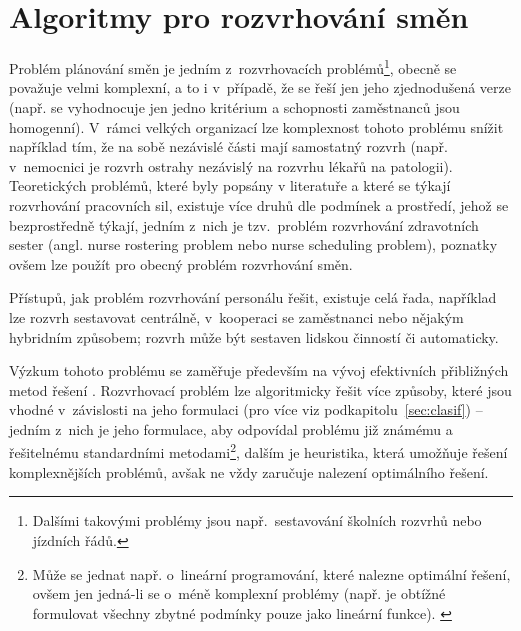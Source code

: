 \documentclass[twoside]{ctuthesis}
\begin{document}


%
%



\chapter{Algoritmy pro rozvrhování směn}
Problém plánování směn je jedním z~rozvrhovacích problémů\footnote{Dalšími takovými problémy jsou např.~sestavování školních rozvrhů nebo jízdních řádů.}, obecně se považuje velmi komplexní, a to i v~případě, že se řeší jen jeho zjednodušená verze (např. se vyhodnocuje jen jedno kritérium a schopnosti zaměstnanců jsou homogenní). V~rámci velkých organizací lze komplexnost tohoto problému snížit například tím, že na sobě nezávislé části mají samostatný rozvrh (např. v~nemocnici je rozvrh ostrahy nezávislý na rozvrhu lékařů na patologii). Teoretických problémů, které byly popsány v literatuře a které se týkají rozvrhování pracovních sil, existuje více druhů dle podmínek a prostředí, jehož se bezprostředně týkají, jedním z~nich je tzv.~problém rozvrhování zdravotních sester (angl. nurse rostering problem nebo nurse scheduling problem), poznatky ovšem lze použít pro obecný problém rozvrhování směn.

Přístupů, jak problém rozvrhování personálu řešit, existuje celá řada, například lze rozvrh sestavovat centrálně, v~kooperaci se zaměstnanci nebo nějakým hybridním způsobem; rozvrh může být sestaven lidskou činností či automaticky.

Výzkum tohoto problému se zaměřuje především na vývoj efektivních přibližných metod řešení \cite{adamuthe2012tabu}. Rozvrhovací problém lze algoritmicky řešit více způsoby, které jsou vhodné v~závislosti na jeho formulaci (pro více viz podkapitolu~\ref{sec:clasif}) -- jedním z~nich je jeho formulace, aby odpovídal problému již známému a řešitelnému standardními metodami\footnote{Může se jednat např. o~lineární programování, které nalezne optimální řešení, ovšem jen jedná-li se o~méně komplexní problémy (např. je obtížné formulovat všechny zbytné podmínky pouze jako lineární funkce). \cite{blochliger2004modeling}}, dalším je heuristika, která umožňuje řešení komplexnějších problémů, avšak ne vždy zaručuje nalezení optimálního řešení. \cite{blochliger2004modeling}
\end{document}
